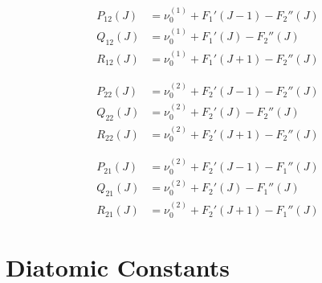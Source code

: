 \documentclass[11pt, twoside, fleqn]{report}
\begin{document}
\begin{align*}
    P_{12}(J) &= \nu_0^{(1)} + F_1'(J - 1) - F_2''(J) \\
    Q_{12}(J) &= \nu_0^{(1)} + F_1'(J) - F_2''(J) \\
    R_{12}(J) &= \nu_0^{(1)} + F_1'(J + 1) - F_2''(J)
\end{align*}

\begin{align*}
    P_{22}(J) &= \nu_0^{(2)} + F_2'(J - 1) - F_2''(J) \\
    Q_{22}(J) &= \nu_0^{(2)} + F_2'(J) - F_2''(J) \\
    R_{22}(J) &= \nu_0^{(2)} + F_2'(J + 1) - F_2''(J)
\end{align*}

\begin{align*}
    P_{21}(J) &= \nu_0^{(2)} + F_2'(J - 1) - F_1''(J) \\
    Q_{21}(J) &= \nu_0^{(2)} + F_2'(J) - F_1''(J) \\
    R_{21}(J) &= \nu_0^{(2)} + F_2'(J + 1) - F_1''(J)
\end{align*}

\appendix
\chapter{Diatomic Constants}
\label{a:diatomic_constants}
\end{document}
